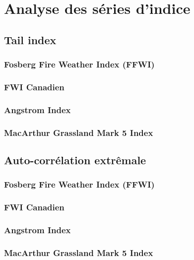 \documentclass[
]{article}
\begin{document}
\hypertarget{analyse-des-suxe9ries-dindice}{%
\section{Analyse des séries
d'indice}\label{analyse-des-suxe9ries-dindice}}

\hypertarget{tail-index}{%
\subsection{Tail index}\label{tail-index}}

\hypertarget{fosberg-fire-weather-index-ffwi-2}{%
\subsubsection{Fosberg Fire Weather Index
(FFWI)}\label{fosberg-fire-weather-index-ffwi-2}}

\hypertarget{fwi-canadien-2}{%
\subsubsection{FWI Canadien}\label{fwi-canadien-2}}

\hypertarget{angstrom-index-2}{%
\subsubsection{Angstrom Index}\label{angstrom-index-2}}

\hypertarget{macarthur-grassland-mark-5-index-2}{%
\subsubsection{MacArthur Grassland Mark 5
Index}\label{macarthur-grassland-mark-5-index-2}}

\hypertarget{auto-corruxe9lation-extruxeamale}{%
\subsection{Auto-corrélation
extrêmale}\label{auto-corruxe9lation-extruxeamale}}

\hypertarget{fosberg-fire-weather-index-ffwi-3}{%
\subsubsection{Fosberg Fire Weather Index
(FFWI)}\label{fosberg-fire-weather-index-ffwi-3}}

\hypertarget{fwi-canadien-3}{%
\subsubsection{FWI Canadien}\label{fwi-canadien-3}}

\hypertarget{angstrom-index-3}{%
\subsubsection{Angstrom Index}\label{angstrom-index-3}}

\hypertarget{macarthur-grassland-mark-5-index-3}{%
\subsubsection{MacArthur Grassland Mark 5
Index}\label{macarthur-grassland-mark-5-index-3}}
\end{document}
